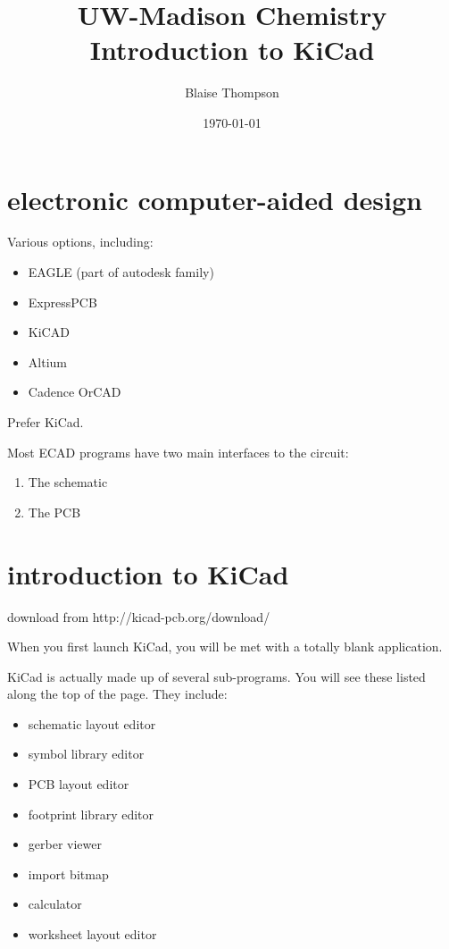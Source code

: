 \documentclass[12pt]{article}
\newenvironment{ditemize}
  {
  \begin{itemize}
  \renewcommand{\labelitemi}{$\rightarrow$}
  }
  {
  \end{itemize}
  }
\begin{document}
\title{UW-Madison Chemistry \\ Introduction to KiCad}
\date{\today}
\author{Blaise Thompson}
\maketitle

\section{electronic computer-aided design}

Various options, including:
\begin{ditemize}
  \item EAGLE (part of autodesk family)
  \item ExpressPCB
  \item KiCAD
  \item Altium
  \item Cadence OrCAD
\end{ditemize}
Prefer KiCad.

Most ECAD programs have two main interfaces to the circuit:
\begin{enumerate}
  \item The schematic
  \item The PCB
\end{enumerate}

\clearpage
\section{introduction to KiCad}

download from http://kicad-pcb.org/download/

When you first launch KiCad, you will be met with a totally blank application.

KiCad is actually made up of several sub-programs.
You will see these listed along the top of the page.
They include:
\begin{ditemize}
  \item schematic layout editor
  \item symbol library editor
  \item PCB layout editor
  \item footprint library editor
  \item gerber viewer
  \item import bitmap
  \item calculator
  \item worksheet layout editor
\end{ditemize}
\end{document}
